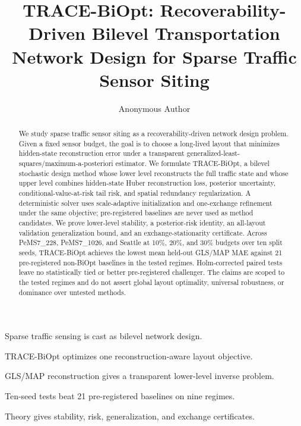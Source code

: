 \documentclass[a4paper,fleqn]{cas-sc}
\begin{document}
\let\WriteBookmarks\relax
\def\floatpagepagefraction{1}
\def\textpagefraction{.001}


\title[mode=title]{TRACE-BiOpt: Recoverability-Driven Bilevel Transportation Network Design for Sparse Traffic Sensor Siting}

\author[1]{Anonymous Author}

\begin{abstract}
We study sparse traffic sensor siting as a recoverability-driven network design problem. Given a fixed sensor budget, the goal is to choose a long-lived layout that minimizes hidden-state reconstruction error under a transparent generalized-least-squares/maximum-a-posteriori estimator. We formulate TRACE-BiOpt, a bilevel stochastic design method whose lower level reconstructs the full traffic state and whose upper level combines hidden-state Huber reconstruction loss, posterior uncertainty, conditional-value-at-risk tail risk, and spatial redundancy regularization. A deterministic solver uses scale-adaptive initialization and one-exchange refinement under the same objective; pre-registered baselines are never used as method candidates. We prove lower-level stability, a posterior-risk identity, an all-layout validation generalization bound, and an exchange-stationarity certificate. Across PeMS7\_228, PeMS7\_1026, and Seattle at 10\%, 20\%, and 30\% budgets over ten split seeds, TRACE-BiOpt achieves the lowest mean held-out GLS/MAP MAE against 21 pre-registered non-BiOpt baselines in the tested regimes. Holm-corrected paired tests leave no statistically tied or better pre-registered challenger. The claims are scoped to the tested regimes and do not assert global layout optimality, universal robustness, or dominance over untested methods.
\end{abstract}

\begin{highlights}
\item Sparse traffic sensing is cast as bilevel network design.
\item TRACE-BiOpt optimizes one reconstruction-aware layout objective.
\item GLS/MAP reconstruction gives a transparent lower-level inverse problem.
\item Ten-seed tests beat 21 pre-registered baselines on nine regimes.
\item Theory gives stability, risk, generalization, and exchange certificates.
\end{highlights}
\end{document}
